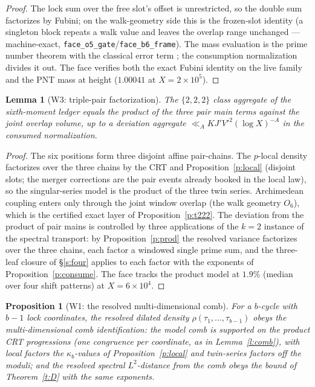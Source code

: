 \documentclass[11pt]{article}
\numberwithin{equation}{section}
\newtheorem{lemma}[theorem]{Lemma}
\newtheorem{proposition}[theorem]{Proposition}
\theoremstyle{definition}
\theoremstyle{remark}
\begin{document}
\begin{proof}
The lock sum over the free slot's offset is unrestricted, so the
double sum factorizes by Fubini; on the walk-geometry side this
is the frozen-slot identity (a singleton block repeats a walk
value and leaves the overlap range unchanged --- machine-exact,
\texttt{face\_o5\_gate}/\texttt{face\_b6\_frame}). The mass
evaluation is the prime number theorem with the classical error
term \cite[\S18]{Dav}; the consumption normalization divides it
out. The face verifies both the exact Fubini identity on the live
family and the PNT mass at height ($1.00041$ at $X=2\times
10^{5}$).
\end{proof}

\begin{lemma}[W3: triple-pair factorization]\label{l:W3}
The $\{2,2,2\}$ class aggregate of the sixth-moment ledger
equals the product of the three pair main terms against the joint
overlap volume, up to a deviation aggregate
$\ll_A KJ'V'^2(\log X)^{-A}$ in the consumed normalization.
\end{lemma}

\begin{proof}
The six positions form three disjoint affine pair-chains. The
$p$-local density factorizes over the three chains by the CRT and
Proposition~\ref{p:local} (disjoint slots; the merger
corrections are the pair events already booked in the local law), so the
singular-series model is the product of the three twin series.
Archimedean coupling enters only through the joint window overlap
(the walk geometry $O_6$), which is the certified exact layer of
Proposition~\ref{p:t222}. The deviation from the product of pair
mains is controlled by three applications of the $k=2$ instance
of the spectral transport: by Proposition~\ref{p:prod} the
resolved variance factorizes over the three chains, each factor a
windowed single prime sum, and the three-leaf closure of
\S\ref{s:four} applies to each factor with the exponents of
Proposition~\ref{p:consume}. The face tracks the product model at
$1.9\%$ (median over four shift patterns) at $X=6\times10^{4}$.
\end{proof}

\begin{proposition}[W1: the resolved multi-dimensional
comb]\label{p:W1}
For a $b$-cycle with $b-1$ lock coordinates, the resolved dilated
density
$\rho(\tau_1,\dots,\tau_{b-1})$ obeys the multi-dimensional comb
identification: the model comb is supported on the product CRT
progressions (one congruence per coordinate, as in
Lemma~\ref{l:comb}), with local factors the $\kappa_b$-values of
Proposition~\ref{p:local} and twin-series factors off the moduli;
and the resolved spectral $L^2$-distance from the comb obeys the
bound of Theorem~\ref{t:D} with the same exponents.
\end{proposition}
\end{document}

